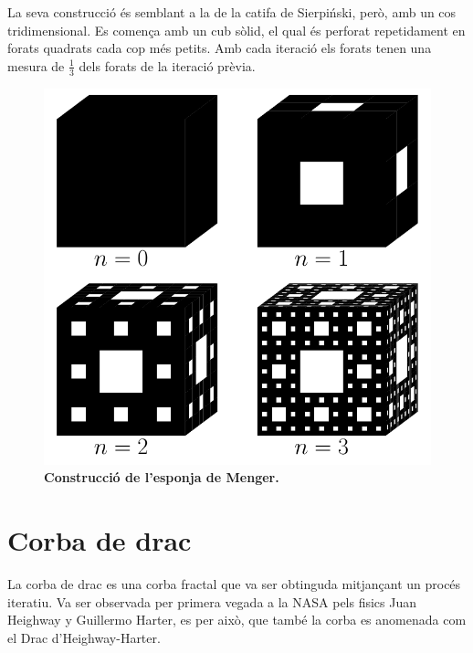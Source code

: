 \documentclass[12pt,a4paper]{report}
\begin{document}
La seva construcció és semblant a la de la catifa de Sierpiński, però, amb un cos tridimensional. Es comença amb un cub sòlid, el qual és perforat repetidament en forats quadrats cada cop més petits. Amb cada iteració els forats tenen una mesura de $\displaystyle\frac{1}{3}$ dels forats de la iteració prèvia.
\begin{figure}[!ht]
\centering
\includegraphics[scale=0.6]{img/img03_14_menger.pdf}
\caption{\textbf{Construcció de l'esponja de Menger.} }
\end{figure}
\section{Corba de drac}
La corba de drac \cite{Lopez:dragon} es una corba fractal que va ser obtinguda mitjançant un procés iteratiu. Va ser observada per primera vegada a la NASA pels fisics Juan Heighway y Guillermo Harter, es per això, que també la corba es anomenada com el Drac d’Heighway-Harter. 
\end{document}
